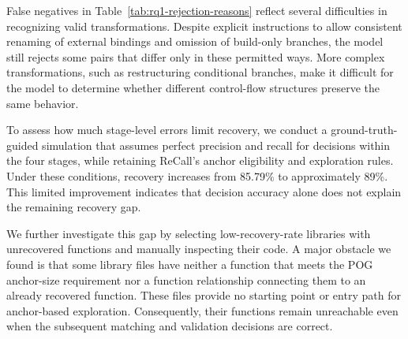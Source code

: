 False negatives in Table~\ref{tab:rq1-rejection-reasons} reflect several difficulties in recognizing valid transformations. Despite explicit instructions to allow consistent renaming of external bindings and omission of build-only branches, the model still rejects some pairs that differ only in these permitted ways. More complex transformations, such as restructuring conditional branches, make it difficult for the model to determine whether different control-flow structures preserve the same behavior.

To assess how much stage-level errors limit recovery, we conduct a ground-truth-guided simulation that assumes perfect precision and recall for decisions within the four stages, while retaining ReCall's anchor eligibility and exploration rules. Under these conditions, recovery increases from 85.79\% to approximately 89\%. This limited improvement indicates that decision accuracy alone does not explain the remaining recovery gap.

We further investigate this gap by selecting low-recovery-rate libraries with unrecovered functions and manually inspecting their code. A major obstacle we found is that some library files have neither a function that meets the POG anchor-size requirement nor a function relationship connecting them to an already recovered function. These files provide no starting point or entry path for anchor-based exploration. Consequently, their functions remain unreachable even when the subsequent matching and validation decisions are correct.


\par\medskip
\noindent{}
\par\medskip
